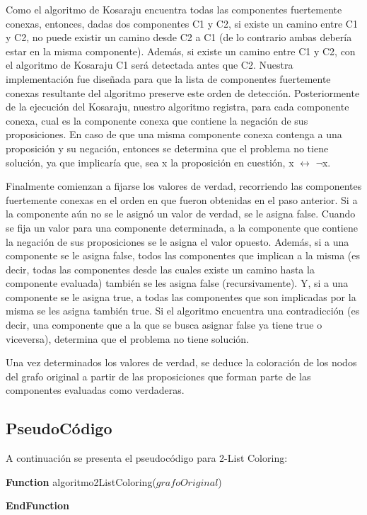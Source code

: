 Como el algoritmo de Kosaraju encuentra todas las componentes fuertemente conexas, entonces, dadas dos componentes C1 y C2, si existe un camino entre C1 y C2, no puede existir un camino desde C2 a C1 (de lo contrario ambas debería estar en la misma componente). Además, si existe un camino entre C1 y C2, con el algoritmo de Kosaraju C1 será detectada antes que C2. Nuestra implementación fue diseñada para que la lista de componentes fuertemente conexas resultante del algoritmo preserve este orden de detección. Posteriormente de la ejecución del Kosaraju, nuestro algoritmo registra, para cada componente conexa, cual es la componente conexa que contiene la negación de sus proposiciones. En caso de que una misma componente conexa contenga a una proposición y su negación, entonces se determina que el problema no tiene solución, ya que implicaría que, sea x la proposición en cuestión, x $\leftrightarrow$ $\lnot$x.

Finalmente comienzan a fijarse los valores de verdad, recorriendo las componentes fuertemente conexas en el orden en que fueron obtenidas en el paso anterior. Si a la componente aún no se le asignó un valor de verdad, se le asigna false. Cuando se fija un valor para una componente determinada, a la componente que contiene la negación de sus proposiciones se le asigna el valor opuesto.  Además, si a una componente se le asigna false, todos las componentes que implican a la misma (es decir, todas las componentes desde las cuales existe un camino hasta la componente evaluada) también se les asigna false (recursivamente). Y, si a una componente se le asigna true, a todas las componentes que son implicadas por la misma se  les asigna también true. Si el algoritmo encuentra una contradicción (es decir, una componente que a la que se busca  asignar false ya tiene true o viceversa), determina que el problema no tiene solución.

Una vez determinados los valores de verdad, se deduce la coloración de los nodos del grafo original a partir de las proposiciones que forman parte de las componentes evaluadas como verdaderas.

\newcommand{\pushcode}[1][1]{\hskip\dimexpr#1\algorithmicindent\relax}
\subsection{PseudoCódigo}

A continuación se presenta el pseudocódigo para 2-List Coloring:

\noindent \textbf{Function} {algoritmo2ListColoring($grafoOriginal$)}
\begin{algorithmic}
	\ENDIF
	\ENDIF
\end{algorithmic}
\textbf{EndFunction}


